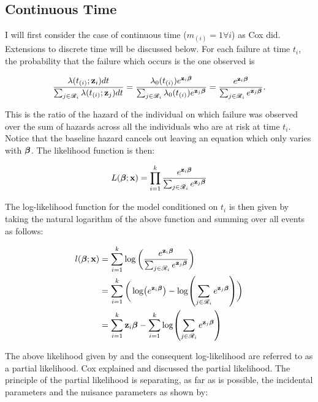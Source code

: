 \subsection{Continuous Time}

I will first consider the case of continuous time ($m_{(i)}=1\forall i$) as Cox  did. Extensions to discrete time will be discussed below. For each failure at time $t_i$, the probability that the failure which occurs is the one observed is 

\begin{equation}
    \frac{\lambda(t_{(i)}; \textbf{z}_i)dt}{\sum_{j\in\mathscr{R}_i}\lambda(t_{(i)}; \textbf{z}_{j})dt} = 
    \frac{\lambda_0(t_{(i)})e^{\textbf{z}_i\boldsymbol{\beta}}}{\sum_{j\in\mathscr{R}_i}\lambda_0(t_{(i)})e^{\textbf{z}_j\boldsymbol{\beta}}} = \frac{e^{\textbf{z}_i\boldsymbol{\beta}}}{\sum_{j\in\mathscr{R}_i}e^{\textbf{z}_j\boldsymbol{\beta}}}.
\end{equation}

This is the ratio of the hazard of the individual on which failure was observed over the sum of hazards across all the individuals who are at risk at time $t_i$. Notice that the baseline hazard cancels out leaving an equation which only varies with $\boldsymbol{\beta}$. The likelihood function is then:

\begin{equation}\label{partial-likelihood-eqn}
    L(\boldsymbol{\beta};\textbf{x}) = \prod_{i=1}^k \frac{e^{\textbf{z}_i\boldsymbol{\beta}}}{\sum_{j\in\mathscr{R}_i}e^{\textbf{z}_j\boldsymbol{\beta}}}
\end{equation}

The log-likelihood function for the model conditioned on ${t_i}$ is then given by taking the natural logarithm of the above function and summing over all events as follows:

\begin{align}
    l(\boldsymbol{\beta};\textbf{x}) &= \sum_{i=1}^k \log\bigg(\frac{e^{\textbf{z}_i\boldsymbol{\beta}}}{\sum_{j\in\mathscr{R}_i}e^{\textbf{z}_j\boldsymbol{\beta}}}\bigg)\\
    &= \sum_{i=1}^k \bigg( \log(e^{\textbf{z}_i\boldsymbol{\beta}}) - \log(\sum_{j\in\mathscr{R}_i}e^{\textbf{z}_j\boldsymbol{\beta}})\bigg)\\
    &= \sum_{i=1}^k \textbf{z}_i\boldsymbol{\beta} - \sum_{i=1}^k \log(\sum_{j\in\mathscr{R}_i}e^{\textbf{z}_j\boldsymbol{\beta}})
\end{align}

The above likelihood given by  and the consequent log-likelihood are referred to as a partial likelihood. Cox  explained and discussed the partial likelihood. The principle of the partial likelihood is separating, as far as is possible, the incidental parameters and the nuisance parameters as shown by:

